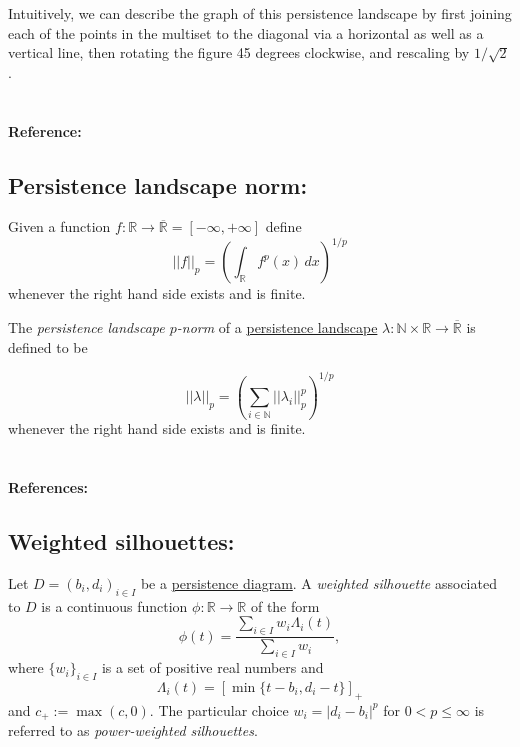 \documentclass{amsart}
\begin{document}
	Intuitively, we can describe the graph of this persistence landscape by first joining each of the points in the multiset to the diagonal via a horizontal as well as a vertical line, then rotating the figure 45 degrees clockwise, and rescaling by $1/\sqrt{2}$.
	
	\paragraph{\\ Reference:} \cite{bubenik2015statistical}
	
	\subsection*{Persistence landscape norm:} \label{persistence landscape norm}
	
	Given a function $f : \mathbb R \to \overline{\mathbb R} = [-\infty, +\infty]$ define
	\begin{equation*}
	||f||_p = \left( \int_{\mathbb R} f^p(x)\, dx \right)^{1/p}
	\end{equation*}
	whenever the right hand side exists and is finite.
	
	The \textit{persistence landscape $p$-norm} of a \hyperref[persistence landscape]{persistence landscape} $\lambda : \mathbb N \times \mathbb R \to \overline{\mathbb R}$ is defined to be
	
	\begin{equation*}
	||\lambda||_p = \left( \sum_{i \in \mathbb N} ||\lambda_i||^p_p \right)^{1/p}
	\end{equation*}
	whenever the right hand side exists and is finite.
	
	\paragraph{\\ References:} \cite{stein2011functional, bubenik2015statistical}
	
	\subsection*{Weighted silhouettes:} \label{weighted silhouettes}
	
	Let $D = {(b_i, d_i)}_{i \in I}$ be a \hyperref[persistence diagram] {persistence diagram}. A \textit{weighted silhouette} associated to $D$ is a continuous function $\phi : \mathbb R \to \mathbb R$ of the form
	\begin{equation*}
	\phi(t) = \frac{\sum_{i \in I}w_i \Lambda_i(t)}{\sum_{i \in I}w_i},
	\end{equation*}
	where $\{w_i\}_{i \in I}$ is a set of positive real numbers and
	\begin{equation*} \label{equation: lambda for persistence landscapes}
	\Lambda_i(t) = \left[ \min \{t-b_i, d_i-t\}\right]_+
	\end{equation*}
	and $c_+ := \max(c,0)$. The particular choice $w_i = \vert d_i - b_i \vert^p$ for $0 < p \leq \infty$ is referred to as \textit{power-weighted silhouettes}.
	
\end{document}
